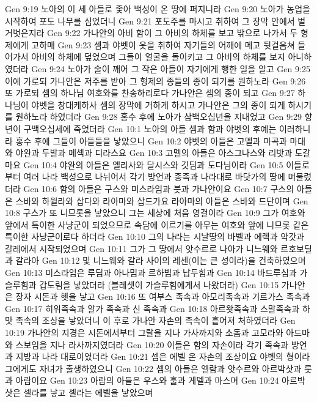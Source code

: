 Gen 9:19  노아의 이 세 아들로 좇아 백성이 온 땅에 퍼지니라
Gen 9:20  노아가 농업을 시작하여 포도 나무를 심었더니
Gen 9:21  포도주를 마시고 취하여 그 장막 안에서 벌거벗은지라
Gen 9:22  가나안의 아비 함이 그 아비의 하체를 보고 밖으로 나가서 두 형제에게 고하매
Gen 9:23  셈과 야벳이 옷을 취하여 자기들의 어깨에 메고 뒷걸음쳐 들어가서 아비의 하체에 덮었으며 그들이 얼굴을 돌이키고 그 아비의 하체를 보지 아니하였더라
Gen 9:24  노아가 술이 깨어 그 작은 아들이 자기에게 행한 일을 알고
Gen 9:25  이에 가로되 가나안은 저주를 받아 그 형제의 종들의 종이 되기를 원하노라
Gen 9:26  또 가로되 셈의 하나님 여호와를 찬송하리로다 가나안은 셈의 종이 되고
Gen 9:27  하나님이 야벳을 창대케하사 셈의 장막에 거하게 하시고 가나안은 그의 종이 되게 하시기를 원하노라 하였더라
Gen 9:28  홍수 후에 노아가 삼백오십년을 지내었고
Gen 9:29  향년이 구백오십세에 죽었더라
Gen 10:1  노아의 아들 셈과 함과 야벳의 후예는 이러하니라 홍수 후에 그들이 아들들을 낳았으니
Gen 10:2  야벳의 아들은 고멜과 마곡과 마대와 야완과 두발과 메섹과 디라스요
Gen 10:3  고멜의 아들은 아스그나스와 리밧과 도갈마요
Gen 10:4  야완의 아들은 엘리사와 달시스와 깃딤과 도다님이라
Gen 10:5  이들로부터 여러 나라 백성으로 나뉘어서 각기 방언과 종족과 나라대로 바닷가의 땅에 머물렀더라
Gen 10:6  함의 아들은 구스와 미스라임과 붓과 가나안이요
Gen 10:7  구스의 아들은 스바와 하윌라와 삽다와 라아마와 삽드가요 라아마의 아들은 스바와 드단이며
Gen 10:8  구스가 또 니므롯을 낳았으니 그는 세상에 처음 영걸이라
Gen 10:9  그가 여호와 앞에서 특이한 사냥군이 되었으므로 속담에 이르기를 아무는 여호와 앞에 니므롯 같은 특이한 사냥군이로다 하더라
Gen 10:10  그의 나라는 시날땅의 바벨과 에렉과 악갓과 갈레에서 시작되었으며
Gen 10:11  그가 그 땅에서 앗수르로 나아가 니느웨와 르호보딜과 갈라아
Gen 10:12  및 니느웨와 갈라 사이의 레센(이는 큰 성이라)을 건축하였으며
Gen 10:13  미스라임은 루딤과 아나밈과 르하빔과 납두힘과
Gen 10:14  바드루심과 가슬루힘과 갑도림을 낳았더라 (블레셋이 가슬루힘에게서 나왔더라)
Gen 10:15  가나안은 장자 시돈과 헷을 낳고
Gen 10:16  또 여부스 족속과 아모리족속과 기르가스 족속과
Gen 10:17  히위족속과 알가 족속과 신 족속과
Gen 10:18  아르왓족속과 스말족속과 하맛 족속의 조상을 낳았더니 이 후로 가나안 자손의 족속이 흩어져 처하였더라
Gen 10:19  가나안의 지경은 시돈에서부터 그랄을 지나 가사까지와 소돔과 고모라와 아드마와 스보임을 지나 라사까지였더라
Gen 10:20  이들은 함의 자손이라 각기 족속과 방언과 지방과 나라 대로이었더라
Gen 10:21  셈은 에벨 온 자손의 조상이요 야벳의 형이라 그에게도 자녀가 출생하였으니
Gen 10:22  셈의 아들은 엘람과 앗수르와 아르박삿과 룻과 아람이요
Gen 10:23  아람의 아들은 우스와 훌과 게델과 마스며
Gen 10:24  아르박삿은 셀라를 낳고 셀라는 에벨을 낳았으며
